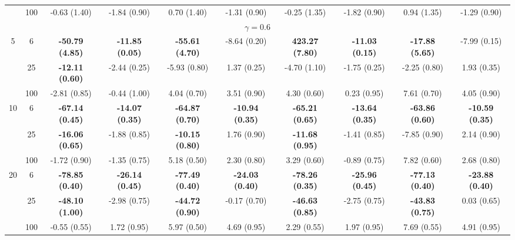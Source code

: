 \documentclass[
  man]{apa6}
\newenvironment{lltable}{\begin{landscape}\centering\begin{ThreePartTable}}{\end{ThreePartTable}\end{landscape}}
\begin{document}
\begin{lltable}
{\begin{longtable}{cccccccccc}
 & 100 & -0.63 (1.40) & -1.84 (0.90) & 0.70 (1.40) & -1.31 (0.90) & -0.25 (1.35) & -1.82 (0.90) & 0.94 (1.35) & -1.29 (0.90)\\
\multicolumn{10}{c}{$\gamma = 0.6$}\\
5 & 6 & \textbf{-50.79 (4.85)} & \textbf{-11.85 (0.05)} & \textbf{-55.61 (4.70)} & -8.64 (0.20) & \textbf{423.27 (7.80)} & \textbf{-11.03 (0.15)} & \textbf{-17.88 (5.65)} & -7.99 (0.15)\\
 & 25 & \textbf{-12.11 (0.60)} & -2.44 (0.25) & -5.93 (0.80) & 1.37 (0.25) & -4.70 (1.10) & -1.75 (0.25) & -2.25 (0.80) & 1.93 (0.35)\\
 & 100 & -2.81 (0.85) & -0.44 (1.00) & 4.04 (0.70) & 3.51 (0.90) & 4.30 (0.60) & 0.23 (0.95) & 7.61 (0.70) & 4.05 (0.90)\\
10 & 6 & \textbf{-67.14 (0.45)} & \textbf{-14.07 (0.35)} & \textbf{-64.87 (0.70)} & \textbf{-10.94 (0.35)} & \textbf{-65.21 (0.65)} & \textbf{-13.64 (0.35)} & \textbf{-63.86 (0.60)} & \textbf{-10.59 (0.35)}\\
 & 25 & \textbf{-16.06 (0.65)} & -1.88 (0.85) & \textbf{-10.15 (0.80)} & 1.76 (0.90) & \textbf{-11.68 (0.95)} & -1.41 (0.85) & -7.85 (0.90) & 2.14 (0.90)\\
 & 100 & -1.72 (0.90) & -1.35 (0.75) & 5.18 (0.50) & 2.30 (0.80) & 3.29 (0.60) & -0.89 (0.75) & 7.82 (0.60) & 2.68 (0.80)\\
20 & 6 & \textbf{-78.85 (0.40)} & \textbf{-26.14 (0.45)} & \textbf{-77.49 (0.40)} & \textbf{-24.03 (0.40)} & \textbf{-78.26 (0.35)} & \textbf{-25.96 (0.45)} & \textbf{-77.13 (0.40)} & \textbf{-23.88 (0.40)}\\
 & 25 & \textbf{-48.10 (1.00)} & -2.98 (0.75) & \textbf{-44.72 (0.90)} & -0.17 (0.70) & \textbf{-46.63 (0.85)} & -2.75 (0.75) & \textbf{-43.83 (0.75)} & 0.03 (0.65)\\
 & 100 & -0.55 (0.55) & 1.72 (0.95) & 5.97 (0.50) & 4.69 (0.95) & 2.29 (0.55) & 1.97 (0.95) & 7.69 (0.55) & 4.91 (0.95)\\
\bottomrule
\end{longtable}

}

\end{lltable}
\end{document}
